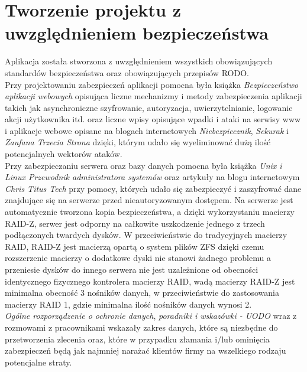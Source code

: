 \documentclass[12pt,a4paper]{article}
\begin{document}
	\section{Tworzenie projektu z uwzględnieniem bezpieczeństwa}
		\indent Aplikacja została stworzona z uwzględnieniem wszystkich obowiązujących standardów bezpieczeństwa oraz obowiązujących przepisów RODO.\\
		\indent Przy projektowaniu zabezpieczeń aplikacji pomocna była książka \emph{Bezpieczeństwo aplikacji webowych}\cite{BAW} opisująca liczne mechanizmy i metody zabezpieczenia
			aplikacji takich jak asynchroniczne szyfrowanie, autoryzacja, uwierzytelnianie, logowanie akcji użytkownika itd. oraz liczne wpisy opisujące wpadki i ataki na serwisy www
			i aplikacje webowe opisane na blogach internetowych	\emph{Niebezpiecznik}\cite{Nieb}, \emph{Sekurak}\cite{Sek} i \emph{Zaufana Trzecia Strona}\cite{ZTS} dzięki,
			którym udało się wyeliminować dużą ilość potencjalnych wektorów ataków.\\
		\indent Przy zabezpieczaniu serwera oraz bazy danych pomocna była książka \emph{Unix i Linux Przewodnik	administratora systemów}\cite{Unix} oraz artykuły na blogu internetowym
			\emph{Chris Titus Tech}\cite{CTT} przy pomocy, których udało się zabezpieczyć i zaszyfrować dane znajdujące się na serwerze przed nieautoryzowanym dostępem. Na serwerze jest 
			automatycznie tworzona kopia bezpieczeństwa, a dzięki wykorzystaniu	macierzy RAID-Z, serwer jest odporny na całkowite uszkodzenie jednego z trzech podłączonych
			twardych dysków. W przeciwieństwie do tradycyjnych macierzy RAID, RAID-Z jest macierzą opartą o system plików ZFS dzięki czemu rozszerzenie macierzy o dodatkowe dyski nie
			stanowi żadnego problemu a przeniesie dysków do innego serwera nie jest uzależnione od obecności identycznego fizycznego kontrolera macierzy RAID, wadą macierzy RAID-Z jest
			minimalna obecność 3 nośników danych, w przeciwieństwie do zastosowania macierzy RAID 1, gdzie minimalna ilość nośników danych wynosi 2.\\
		\indent \emph{Ogólne rozporządzenie o ochronie danych}\cite{RODO}, \emph{poradniki i wskazówki - UODO}\cite{UODO} wraz z rozmowami z pracownikami wskazały zakres danych, które są
			niezbędne do przetworzenia zlecenia oraz, które w przypadku złamania i/lub ominięcia zabezpieczeń będą jak najmniej narażać klientów firmy na wszelkiego rodzaju potencjalne
			straty.  
	\newpage
	
\end{document}
